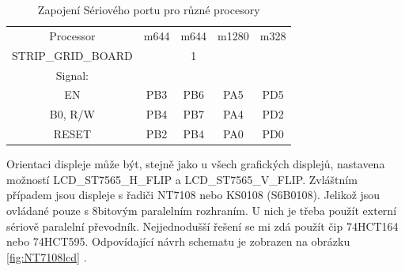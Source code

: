 \begin{table}[H]
  \begin{center}
    \begin{tabular}{| c || c | c | c | c |}
    \hline
 Processor  & m644  & m644 & m1280  & m328 \\
STRIP\_GRID\_BOARD &       &   1   &        &     \\
    \hline
    \hline
Signal:     &       &       &        &         \\
  EN        &  PB3  & PB6   &  PA5   & PD5     \\
    \hline
  B0, R/W   &  PB4  & PB7   &  PA4   & PD2      \\
    \hline
  RESET     &  PB2  & PB4   &  PA0   & PD0      \\
    \hline
    \end{tabular}
  \end{center}
  \caption{Zapojení Sériového portu pro různé procesory}
  \label{tab:ser-processor}
\end{table}

Orientaci displeje může být, stejně jako u všech grafických displejů, nastavena
možností LCD\_ST7565\-\_H\_FLIP a LCD\_ST7565\-\_V\_FLIP.
Zvláštním případem jsou displeje s řadiči NT7108 nebo KS0108 (S6B0108). Jelikož jsou ovládané
pouze s 8bitovým paralelním rozhraním. U nich je třeba použít externí sériově paralelní převodník.
Nejjednodušší řešení se mi zdá použít čip 74HCT164 nebo 74HCT595.
Odpovídající návrh schematu je zobrazen na obrázku \ref{fig:NT7108lcd} .

